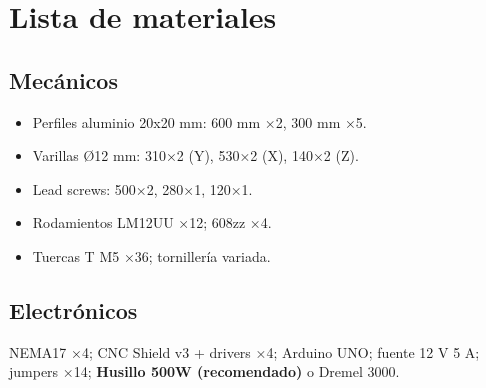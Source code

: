 \chapter{Lista de materiales}
\label{ch:materials}
\section*{Mecánicos}
\begin{itemize}
  \item Perfiles aluminio 20x20 mm: 600 mm ×2, 300 mm ×5.
  \item Varillas Ø12 mm: 310×2 (Y), 530×2 (X), 140×2 (Z).
  \item Lead screws: 500×2, 280×1, 120×1.
  \item Rodamientos LM12UU ×12; 608zz ×4.
  \item Tuercas T M5 ×36; tornillería variada.
\end{itemize}

\section*{Electrónicos}
NEMA17 ×4; CNC Shield v3 + drivers ×4; Arduino UNO; fuente 12 V 5 A; jumpers ×14;  
\textbf{Husillo 500W (recomendado)} o Dremel 3000.

